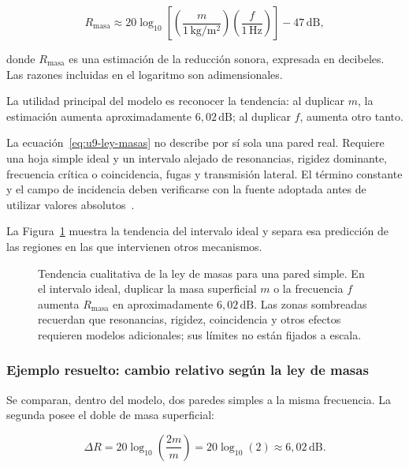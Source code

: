 \begin{equation}
    R_\mathrm{masa}
      \approx
      20\log_{10}\!\left[
        \left(\frac{m}{1\,\text{kg}/\text{m}^2}\right)
        \left(\frac{f}{1\,\text{Hz}}\right)
      \right]
      -47\,\text{dB},
    \label{eq:u9-ley-masas}
\end{equation}

donde \(R_\mathrm{masa}\) es una estimación de la reducción sonora, expresada
en decibeles. Las razones incluidas en el logaritmo son adimensionales.

La utilidad principal del modelo es reconocer la tendencia: al duplicar
\(m\), la estimación aumenta aproximadamente \(6{,}02\,\text{dB}\); al
duplicar \(f\), aumenta otro tanto.

La ecuación~\eqref{eq:u9-ley-masas} no describe por sí sola una pared
real. Requiere una hoja simple ideal y un intervalo alejado de resonancias,
rigidez dominante, frecuencia crítica o coincidencia, fugas y transmisión
lateral. El término constante y el campo de incidencia deben verificarse con
la fuente adoptada antes de utilizar valores absolutos~\cite{fahyGardonio2007}.

La Figura~\ref{fig:u9-ley-masas} muestra la tendencia del intervalo ideal y
separa esa predicción de las regiones en las que intervienen otros
mecanismos.

\begin{figure}[!t]
    \centering
    
    \caption{Tendencia cualitativa de la ley de masas para una pared simple.
    En el intervalo ideal, duplicar la masa superficial \(m\) o la frecuencia
    \(f\) aumenta \(R_\mathrm{masa}\) en aproximadamente
    \(6{,}02\,\text{dB}\). Las zonas sombreadas recuerdan que resonancias,
    rigidez, coincidencia y otros efectos requieren modelos adicionales; sus
    límites no están fijados a escala.}
    \label{fig:u9-ley-masas}
\end{figure}

\subsubsection*{Ejemplo resuelto: cambio relativo según la ley de masas}

Se comparan, dentro del modelo, dos paredes simples a la misma frecuencia. La
segunda posee el doble de masa superficial:

\[
    \Delta R
      =20\log_{10}\!\left(\frac{2m}{m}\right)
      =20\log_{10}(2)
      \approx6{,}02\,\text{dB}.
\]

